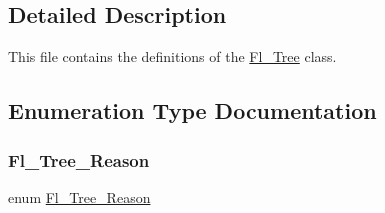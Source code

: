 \subsection{Detailed Description}
This file contains the definitions of the \hyperlink{class_fl___tree}{Fl\+\_\+\+Tree} class. 



\subsection{Enumeration Type Documentation}
\mbox{\label{_fl___tree_8_h_a006d7648bd2fdf6cfcb877eb592a1bf3}} 
\subsubsection{\texorpdfstring{Fl\+\_\+\+Tree\+\_\+\+Reason}{Fl\_Tree\_Reason}}
{\footnotesize\ttfamily enum \hyperlink{_fl___tree_8_h_a006d7648bd2fdf6cfcb877eb592a1bf3}{Fl\+\_\+\+Tree\+\_\+\+Reason}}

